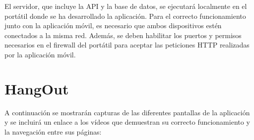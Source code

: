 El servidor, que incluye la API y la base de datos, se ejecutará localmente en el portátil donde se ha desarrollado la aplicación. Para el correcto funcionamiento junto con la aplicación móvil, es necesario que ambos dispositivos estén conectados a la misma red. Además, se deben habilitar los puertos y permisos necesarios en el firewall del portátil para aceptar las peticiones HTTP realizadas por la aplicación móvil.

\section{HangOut}

A continuación se mostrarán capturas de las diferentes pantallas de la aplicación y se incluirá un enlace a los vídeos que demuestran su correcto funcionamiento y la navegación entre sus páginas:

